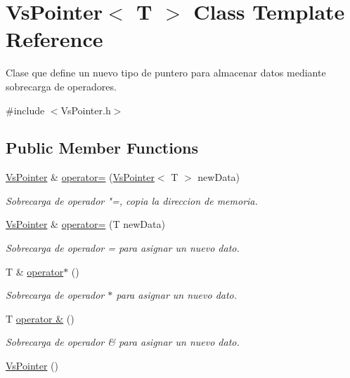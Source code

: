 \hypertarget{class_vs_pointer}{}\section{Vs\+Pointer$<$ T $>$ Class Template Reference}
\label{class_vs_pointer}


Clase que define un nuevo tipo de puntero para almacenar datos mediante sobrecarga de operadores.  




{\ttfamily \#include $<$Vs\+Pointer.\+h$>$}

\subsection*{Public Member Functions}
\begin{DoxyCompactItemize}
\item 
\hyperlink{class_vs_pointer}{Vs\+Pointer} \& \hyperlink{class_vs_pointer_a2dce5e7bf3f34c84debbd01b0c685d10}{operator=} (\hyperlink{class_vs_pointer}{Vs\+Pointer}$<$ T $>$ new\+Data)
\begin{DoxyCompactList}\small\item\em Sobrecarga de operador "=\textquotesingle{}, copia la direccion de memoria. \end{DoxyCompactList}\item 
\hyperlink{class_vs_pointer}{Vs\+Pointer} \& \hyperlink{class_vs_pointer_af254cb1b44d921143343865939a8ed8d}{operator=} (T new\+Data)
\begin{DoxyCompactList}\small\item\em Sobrecarga de operador = para asignar un nuevo dato. \end{DoxyCompactList}\item 
T \& \hyperlink{class_vs_pointer_a6b59daca87b17efea69428a180857a38}{operator$\ast$} ()
\begin{DoxyCompactList}\small\item\em Sobrecarga de operador $\ast$ para asignar un nuevo dato. \end{DoxyCompactList}\item 
T \hyperlink{class_vs_pointer_a0994de6e663a59aa7cb18109ded98e28}{operator \&} ()
\begin{DoxyCompactList}\small\item\em Sobrecarga de operador \& para asignar un nuevo dato. \end{DoxyCompactList}\item 
\hyperlink{class_vs_pointer_ad2066426995a68e2fde8c62c55cc2396}{Vs\+Pointer} ()

\end{DoxyCompactItemize}
